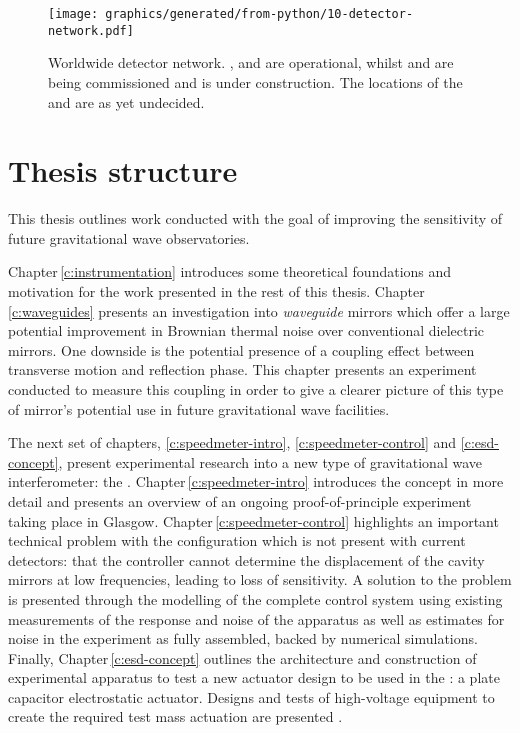 \begin{figure}
  \centering
  \texttt{[image: graphics/generated/from-python/10-detector-network.pdf]}
  \caption[Worldwide detector network]{\label{fig:detector-network}Worldwide detector network. \GEO{}, \LHO{} and \LLO{} are operational, whilst \VIRGO{} and \KAGRA{} are being commissioned and \INDIGO{} is under construction. The locations of the \ET{} and \LIGOCE{} are as yet undecided.}
\end{figure}

\section{Thesis structure}
This thesis outlines work conducted with the goal of improving the sensitivity of future gravitational wave observatories.

Chapter\,\ref{c:instrumentation} introduces some theoretical foundations and motivation for the work presented in the rest of this thesis. Chapter\,\ref{c:waveguides} presents an investigation into \emph{waveguide} mirrors which offer a large potential improvement in Brownian thermal noise over conventional dielectric mirrors. One downside is the potential presence of a coupling effect between transverse motion and reflection phase. This chapter presents an experiment conducted to measure this coupling in order to give a clearer picture of this type of mirror's potential use in future gravitational wave facilities.

The next set of chapters, \ref{c:speedmeter-intro}, \ref{c:speedmeter-control} and \ref{c:esd-concept}, present experimental research into a new type of gravitational wave interferometer: the \SSM{}. Chapter\,\ref{c:speedmeter-intro} introduces the concept in more detail and presents an overview of an ongoing proof-of-principle experiment taking place in Glasgow. Chapter\,\ref{c:speedmeter-control} highlights an important technical problem with the \SSM{} configuration which is not present with current detectors: that the controller cannot determine the displacement of the cavity mirrors at low frequencies, leading to loss of sensitivity. A solution to the problem is presented through the modelling of the complete control system using existing measurements of the response and noise of the apparatus as well as estimates for noise in the experiment as fully assembled, backed by numerical simulations. Finally, Chapter\,\ref{c:esd-concept} outlines the architecture and construction of experimental apparatus to test a new actuator design to be used in the \SSMEXPT{}: a plate capacitor electrostatic actuator. Designs and tests of high-voltage equipment to create the required test mass actuation are presented .

